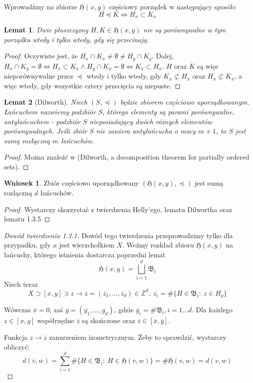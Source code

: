 \documentclass[licencjacka]{pracamgr}
\theoremstyle{definition}
\theoremstyle{definition}
\theoremstyle{definition}
\theoremstyle{definition}
\theoremstyle{definition}
\newtheorem{corollary}{Wniosek}[section]
\theoremstyle{plain}
\newtheorem{lemma}{Lemat}[section]
\theoremstyle{plain}
\begin{document}
Wprowadźmy na zbiorze $ \mathfrak{H}(x,y) $ częściowy porządek w następujący sposób:
$$ H \preceq K \iff H_x \subset K_x $$

\begin{lemma}
	Dwie płaszczyzny $H,K \in \mathfrak{H}(x,y)$ nie są porównywalne w tym 
	porządku wtedy i tylko wtedy, gdy się przecinają.
\end{lemma}
\begin{proof}
	Oczywiste jest, że $ H_x \cap K_x \neq \emptyset \neq H_y \cap K_y $. Dalej, 
	$ H_x \cap K_y = \emptyset \iff H_x \subset K_x  \wedge H_y \cap K_x = \emptyset \iff
	K_x \subset H_x$. $ H $ oraz $ K $ są więc nieporównywalne przez $ \preceq $ wtedy 
	i tylko wtedy, gdy $ K_x \not\subset H_x $ oraz $ H_x \not\subset K_x $, a więc 
	wtedy, gdy wszystkie cztery przecięcia są niepuste.
\end{proof}

\begin{lemma}[Dilworth]
	Niech $ (S, \preceq) $ będzie zbiorem częściowo uporządkowanym. Łańcuchem nazwiemy 
	podzbiór $S $, 
	którego elementy są parami porównywalne, antyłańcuchem - podzbiór $ S $ nieposiadający 
	dwóch różnych elementów porównywalnych. Jeśli zbiór $ S $ nie zawiera antyłańcucha 
	o mocy $ m + 1 $, to $ S $ jest sumą rozłączną $ m $ łańcuchów.
\end{lemma}
\begin{proof}
	Można znaleźć w (Dilworth, a decomposition theorem for partially ordered sets).
\end{proof}
\begin{corollary}
	Zbiór częściowo uporządkowany $ \left(\mathfrak{H}(x,y), \preceq \right) $ 
	jest sumą rozłączną $ d $ 
	łańcuchów.	
\end{corollary}
\begin{proof}
	Wystarczy skorzystać z twierdzenia Helly'ego, lematu Dilwortha oraz 
	lematu 1.3.5 
\end{proof}
\begin{proof}[Dowód twierdzenia 1.3.1]
	Dowód tego twierdzenia przeprowadzimy tylko dla przypadku, gdy $ x $ jest 
	wierzchołkiem $ X $. Weźmy rozkład zbioru $ \mathfrak{H}(x,y)$ na łańcuchy, którego 
	istnienia dostarcza poprzedni lemat
	 $$ \mathfrak{H}(x,y) = \bigsqcup\limits_{i=1}^{d} \mathfrak{B}_i  $$
	Niech teraz 
	$$ X \supset [x,y] \ni z \rightarrow \overline{z} = (\overline{z_1}, \dots, 
	\overline{z_d}) \in \mathbb{Z}^d, ~ \overline{z_i} = \# \{H \in \mathfrak{B}_i: ~ 
	z \in H_y\} $$

	Wówczas $ \overline{x} = 0$, zaś $ \overline{y} = (\overline{y_1}, \dots, 
	\overline{y_d}) $, gdzie $ \overline{y_i} = \# \mathfrak{B}_i, i = 1 \dots d$. 
	Dla każdego $ z \in [x,y] $ współrzędne $ \overline{z} $ są skończone oraz 
	$ \overline{z} \in [\overline{x}, \overline{y}] $.

	Funkcja $ z \rightarrow \overline{z} $ zanurzeniem izometrycznym. Żeby to sprawdzić, 
	wystarczy obliczyć:
	$$ d(\overline{v}, \overline{w}) = \sum\limits_{i=1}^d \# \{ 
	H \in \mathfrak{B}_i: ~ H \in \mathfrak{H}(v,w) \} = \# \mathfrak{H}(v,w) = 
	d(v,w)$$
\end{proof}
\end{document}
